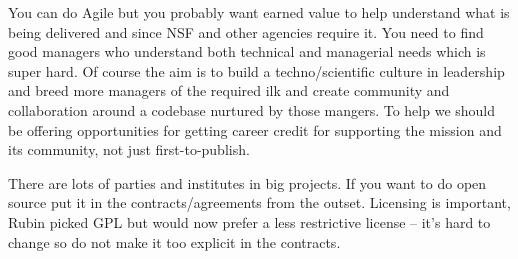 \documentclass[11pt,twoside]{article}
\begin{document}
You can do Agile but you probably want earned value \citep{2014SPIE.9150E..1EG,2016SPIE.9911E..0NK} to help understand what is being delivered and since NSF and other agencies require it.
You need to find good managers who understand both technical and managerial needs which is  super hard.
Of course the aim is to build a techno/scientific  culture in leadership and breed more managers of the required ilk and
create community and collaboration around a codebase nurtured by those mangers.
To help
we should be offering opportunities for getting career credit for supporting the mission and its community, not just first-to-publish.

There are lots of parties and institutes in big projects.
If you want to do open source put it in the contracts/agreements from the outset.
Licensing is important, Rubin picked GPL but would now prefer a less restrictive license -- it's hard to change
so do not make it too explicit in the contracts.



\end{document}
